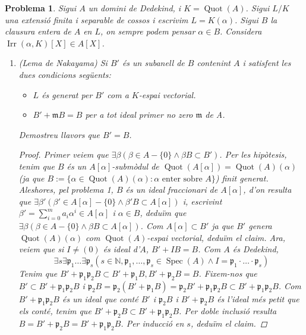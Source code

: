 \documentclass{article}
\DeclareMathOperator{\Quot}{Quot}
\DeclareMathOperator{\Irr}{Irr}
\DeclareMathOperator{\Spec}{Spec}
\newtheorem{problema}{Problema}
\begin{document}
\begin{problema}
    Sigui $A$ un domini de Dedekind, i $K=\Quot(A)$. Sigui $L/K$ una extensió finita i separable de cossos i escrivim $L=K(\alpha)$. Sigui $B$ la clausura entera de $A$ en $L$, on sempre podem pensar $\alpha\in B$. Considera $\Irr(\alpha,K)[X]\in A[X]$.
    \begin{enumerate}
        \item (Lema de Nakayama) Si $B'$ és un subanell de $B$ contenint $A$ i satisfent les dues condicions següents:
        \begin{itemize}
            \item $L$ és generat per $B'$ com a $K$-espai vectorial.
            \item $B'+\mathfrak{m}B=B$ per a tot ideal primer no zero $\mathfrak{m}$ de A.
        \end{itemize}
        Demostreu llavors que $B'=B$.
        \begin{proof}
            Primer veiem que $\exists\beta(\beta\in A-\{0\}\land\beta B\subset B')$. Per les hipòtesis, tenim que $B$ és un $A[\alpha]$-submòdul de $\Quot(A[\alpha])=\Quot(A)(\alpha)$ (ja que $B:=\{\alpha\in\Quot(A)(\alpha):\alpha\textrm{ enter sobre }A\}$) finit generat. Aleshores, pel problema 1, $B$ és un ideal fraccionari de $A[\alpha]$, d'on resulta que $\exists\beta'(\beta'\in A[\alpha]-\{0\}\land\beta' B\subset A[\alpha])$ i, escrivint $\beta'=\sum_{i=0}^{m}a_{i}\alpha^{i}\in A[\alpha]$ i $\alpha\in B$, deduïm que $\exists\beta(\beta\in A-\{0\}\land\beta B\subset A[\alpha])$. Com $A[\alpha]\subset B'$ ja que $B'$ genera $\Quot(A)(\alpha)$ com $\Quot(A)$-espai vectorial, deduïm el claim.\newline
            Ara, veiem que si $I\neq(0)$ és ideal d'$A$, $B'+IB=B$. Com $A$ és Dedekind,
            \begin{equation*}
                \exists s\exists\mathfrak{p}_{1}\ldots\exists\mathfrak{p}_{s}(s\in\mathbb{N},
                \mathfrak{p}_{1},\dots,\mathfrak{p}_{s}\in\Spec(A)\land I=\mathfrak{p}_{1}\cdot\ldots\cdot\mathfrak{p}_{s})
            \end{equation*}
            Tenim que $B'+\mathfrak{p}_{1}\mathfrak{p}_{2}B\subset B'+\mathfrak{p}_{1}B,B'+\mathfrak{p}_{2}B=B$. Fixem-nos que $B'\subset B'+\mathfrak{p}_{1}\mathfrak{p}_{2}B$ i $\mathfrak{p}_{2}B=\mathfrak{p}_{2}(B'+\mathfrak{p}_{1}B)=\mathfrak{p}_{2}B'+\mathfrak{p}_{1}\mathfrak{p}_{2}B\subset B'+\mathfrak{p}_{1}\mathfrak{p}_{2}B$. Com $B'+\mathfrak{p}_{1}\mathfrak{p}_{2}B$ és un ideal que conté $B'$ i $\mathfrak{p_{2}}B$ i $B'+\mathfrak{p_{2}}B$ és l'ideal més petit que els conté, tenim que $B'+\mathfrak{p_{2}}B\subset B'+\mathfrak{p}_{1}\mathfrak{p}_{2}B$. Per doble inclusió resulta $B=B'+\mathfrak{p_{2}}B=B'+\mathfrak{p}_{1}\mathfrak{p}_{2}B$. Per inducció en $s$, deduïm el claim.\newline

\end{proof}
\end{enumerate}
\end{problema}
\end{document}
